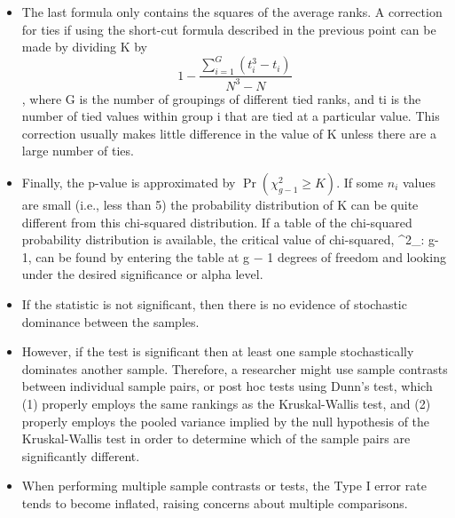 \begin{itemize}
\item The last formula only contains the squares of the average ranks.
A correction for ties if using the short-cut formula described in the previous point can be made by dividing K by \[1 - \frac{\sum_{i=1}^G (t_i^3 - t_i)}{N^3-N}\], where G is the number of groupings of different tied ranks, and ti is the number of tied values within group i that are tied at a particular value. This correction usually makes little difference in the value of K unless there are a large number of ties.
\item Finally, the p-value is approximated by $\Pr(\chi^2_{g-1} \ge K)$. If some $n_i$ values are small (i.e., less than 5) the probability distribution of K can be quite different from this chi-squared distribution. If a table of the chi-squared probability distribution is available, the critical value of chi-squared, \chi^2_{\alpha: g-1}, can be found by entering the table at g − 1 degrees of freedom and looking under the desired significance or alpha level.
\item If the statistic is not significant, then there is no evidence of stochastic dominance between the samples. 
\item However, if the test is significant then at least one sample stochastically dominates another sample. Therefore, a researcher might use sample contrasts between individual sample pairs, or post hoc tests using Dunn's test, which (1) properly employs the same rankings as the Kruskal-Wallis test, and (2) properly employs the pooled variance implied by the null hypothesis of the Kruskal-Wallis test in order to determine which of the sample pairs are significantly different.
\item When performing multiple sample contrasts or tests, the Type I error rate tends to become inflated, raising concerns about multiple comparisons.
\end{itemize}

